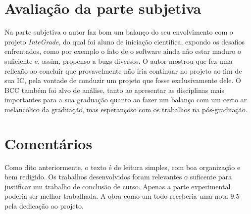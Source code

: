 \documentclass{article}
\begin{document}
	
\section{Avaliação da parte subjetiva}
	Na parte subjetiva o autor faz bom um balanço do seu envolvimento com o projeto \emph{InteGrade}, do qual foi aluno de iniciação científica, expondo os desafios enfrentados, como por exemplo o fato de o software ainda não estar maduro o suficiente e, assim, propenso a bugs diversos. O autor mostrou que fez uma reflexão ao concluir que provavelmente não iria continuar no projeto ao fim de sua IC, pela vontade de conduzir um projeto que fosse exclusivamente dele. O BCC também foi alvo de análise, tanto ao apresentar as disciplinas mais importantes para a sua graduação quanto ao fazer um balanço com um certo ar melancólico da graduação, mas esperançoso com os trabalhos na pós-graduação. 
	
\section{Comentários}
	Como dito anteriormente, o texto é de leitura simples, com boa organização e bem redigido. Os trabalhos desenvolvidos foram relevantes o suficente para justificar um trabalho de conclusão de curso. Apenas a parte experimental poderia ser melhor trabalhada. A obra como um todo receberia uma nota $9.5$ pela dedicação ao projeto.


%
%
\end{document}
